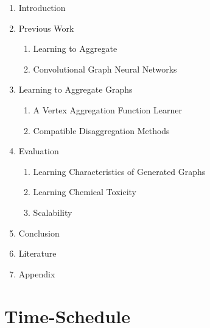 \documentclass[12pt]{scrartcl}
\begin{document}
\begin{enumerate}
	\item Introduction
	\item Previous Work
		\begin{enumerate}[label*=\arabic*.]
			\item Learning to Aggregate
			\item Convolutional Graph Neural Networks
		\end{enumerate}
	\item Learning to Aggregate Graphs
	\begin{enumerate}[label*=\arabic*.]
		\item A Vertex Aggregation Function Learner
		\item Compatible Disaggregation Methods
	\end{enumerate}
	\item Evaluation
		\begin{enumerate}[label*=\arabic*.]
			\item Learning Characteristics of Generated Graphs
			\item Learning Chemical Toxicity
			\item Scalability
		\end{enumerate}
	\item Conclusion
	\item Literature
	\item Appendix
\end{enumerate}

\section{Time-Schedule}%
\label{sec:schedule}
\end{document}
